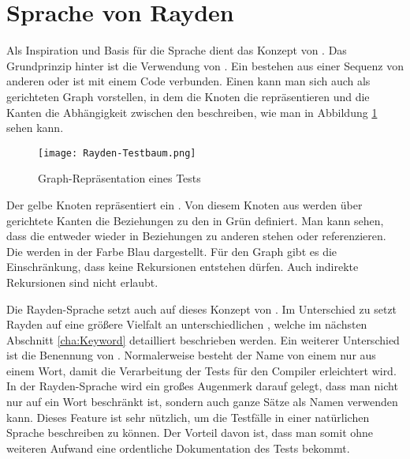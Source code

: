 
\section{Sprache von Rayden}

Als Inspiration und Basis für die Sprache dient das Konzept von . Das Grundprinzip hinter  ist die Verwendung von . Ein  bestehen aus einer Sequenz von anderen  oder ist mit einem Code verbunden. Einen  kann man sich auch als gerichteten Graph vorstellen, in dem die Knoten die  repräsentieren und die Kanten die Abhängigkeit zwischen den  beschreiben, wie man in Abbildung \ref{fig:test-graph} sehen kann. 

\begin{figure}[h]
\centering
\texttt{[image: Rayden-Testbaum.png]}
\caption{Graph-Repräsentation eines Tests}
\label{fig:test-graph}
\end{figure}

\SuperPar
Der gelbe Knoten repräsentiert ein . Von diesem Knoten aus werden über gerichtete Kanten die Beziehungen zu den  in Grün definiert. Man kann sehen, dass die  entweder wieder in Beziehungen zu anderen  stehen oder  referenzieren. Die  werden in der Farbe Blau dargestellt. Für den Graph gibt es die Einschränkung, dass keine Rekursionen entstehen dürfen. Auch indirekte Rekursionen sind nicht erlaubt.

\SuperPar
Die Rayden-Sprache setzt auch auf dieses Konzept von . Im Unterschied zu  setzt Rayden auf eine größere Vielfalt an unterschiedlichen , welche im nächsten Abschnitt \ref{cha:Keyword} detailliert beschrieben werden. Ein weiterer Unterschied ist die Benennung von . Normalerweise besteht der Name von einem  nur aus einem Wort, damit die Verarbeitung der Tests für den Compiler erleichtert wird. In der Rayden-Sprache wird ein großes Augenmerk darauf gelegt, dass man nicht nur auf ein Wort beschränkt ist, sondern auch ganze Sätze als Namen verwenden kann. Dieses Feature ist sehr nützlich, um die Testfälle in einer natürlichen Sprache beschreiben zu können. Der Vorteil davon ist, dass man somit ohne weiteren Aufwand eine ordentliche Dokumentation des Tests bekommt.

